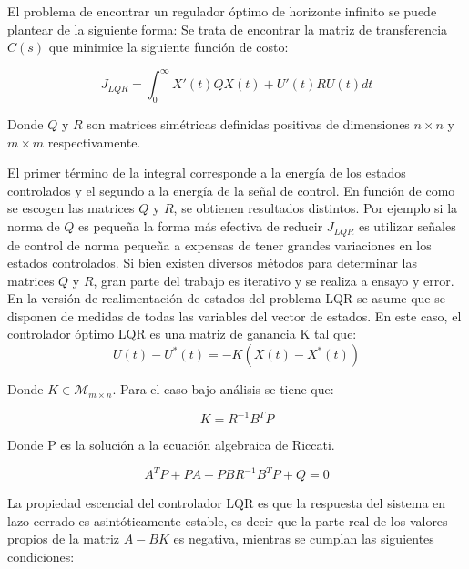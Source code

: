 \documentclass[main]{subfiles}
\begin{document}
El problema de encontrar un regulador \'optimo de horizonte infinito se puede plantear de la siguiente forma: Se trata de encontrar la matriz de transferencia $C(s)$ que minimice la siguiente funci\'on de costo:

\begin{equation}
\label{eq:lqr}
J_{LQR} = \int_{0}^{\infty}  X'(t)Q X(t)+U'(t)RU(t)dt
\end{equation}

Donde $Q$ y $R$ son matrices sim\'etricas definidas positivas de dimensiones $n\times n$ y $m\times m$ respectivamente. 

El primer t\'ermino de la integral corresponde a la energ\'ia de los estados controlados y el segundo a la energ\'ia de la señal de control. En funci\'on de como se escogen las matrices $Q$ y $R$, se obtienen resultados distintos. Por ejemplo si la norma de $Q$ es pequeña la forma m\'as efectiva de reducir $J_{LQR}$ es utilizar señales de control de norma pequeña a expensas de tener grandes variaciones en los estados controlados. Si bien existen diversos m\'etodos para determinar las matrices $Q$ y $R$, gran parte del trabajo es iterativo y se realiza a ensayo y error.\\  

En la versi\'on de realimentaci\'on de estados del problema LQR se asume que se disponen de medidas de todas las variables del vector de estados. En este caso, el controlador \'optimo LQR es una matriz de ganancia K tal que:
\begin{equation}
U(t)-U^*(t) = -K(X(t)-X^*(t))
\end{equation}

Donde $K\in\mathcal{M}_{m\times n}$. Para el caso bajo an\'alisis se tiene que: 

\begin{equation}
K = R^{-1}B^TP
\end{equation}

Donde P es la soluci\'on a la ecuaci\'on algebraica de Riccati.

\begin{equation}
  \label{eq:riccati}
  A^TP + PA - PBR^{-1}B^TP + Q = 0
\end{equation}

La propiedad escencial del controlador LQR es que la respuesta del sistema en lazo cerrado es asint\'oticamente estable, es decir que la parte real de los valores propios de la matriz $A-BK$ es negativa, mientras se cumplan las siguientes condiciones:
\end{document}
